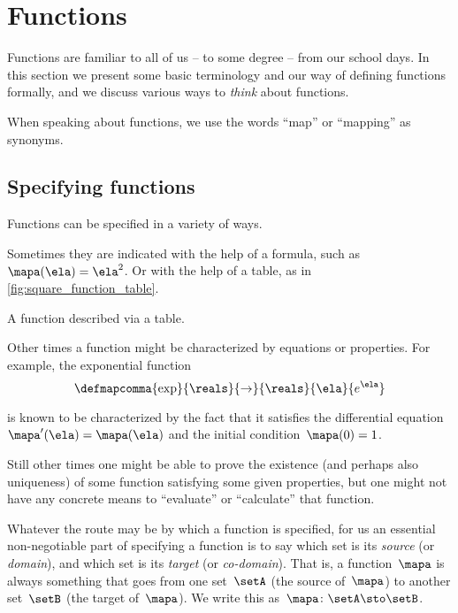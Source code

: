 
\section{Functions}
\label{sec:functions}

Functions are familiar to all of us -- to some degree -- from our school days.
In this section we present some basic terminology and our way of defining functions formally, and we discuss various ways to \emph{think} about functions.

When speaking about functions, we use the words ``map'' or ``mapping'' as synonyms.

\subsection{Specifying functions}
\label{sec:domain-codomain}

Functions can be specified in a variety of ways.

Sometimes they are indicated with the help of a formula, such as~$\mapa(\ela)=\ela^2$.
Or with the help of a table, as in \cref{fig:square_function_table}.

\begin{marginfigure}
    \centering
    \caption{A function described via a table.}
    \label{fig:square_function_table}
\end{marginfigure}

Other times a function might be characterized by equations or properties.
For example, the exponential function
\begin{equation*}
    \defmapcomma{\exp}
    {\reals}
    {\to}
    {\reals}
    {\ela}
    {e^\ela}
\end{equation*}

is known to be characterized by the fact that it satisfies the differential equation~$\mapa'(\ela) = \mapa(\ela)$ and the initial condition~$\mapa(0) =1$.

Still other times one might be able to prove the existence (and perhaps also uniqueness) of some function satisfying some given properties, but one might not have any concrete means to ``evaluate'' or ``calculate'' that function.

Whatever the route may be by which a function is specified, for us an essential non-negotiable part of specifying a function is to say which set is its \emph{source} (or \emph{domain}), and which set is its \emph{target} (or \emph{co-domain}).
That is, a function~$\mapa$ is always something that goes from one set~$\setA$ (the source of~$\mapa$) to another set~$\setB$ (the target of~$\mapa$).
We write this as~$\mapa\colon \setA \sto \setB$.

